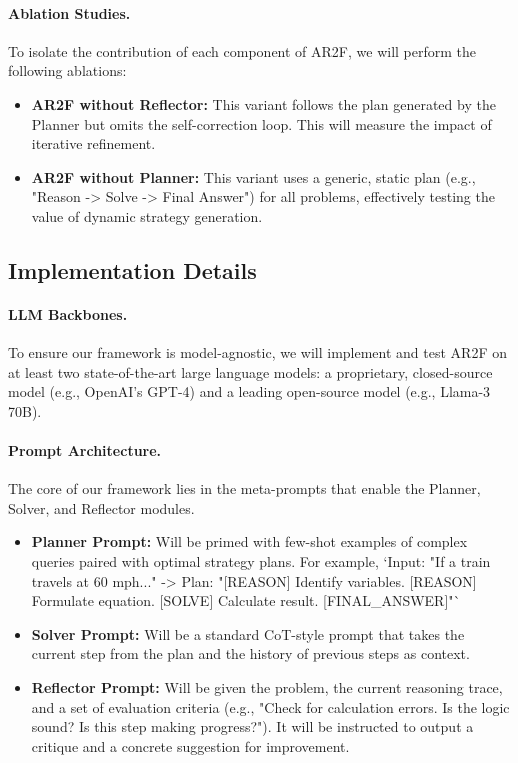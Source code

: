 \documentclass{article}
\begin{document}
\paragraph{Ablation Studies.} To isolate the contribution of each component of AR2F, we will perform the following ablations:
\begin{itemize}
    \item \textbf{AR2F without Reflector:} This variant follows the plan generated by the Planner but omits the self-correction loop. This will measure the impact of iterative refinement.
    \item \textbf{AR2F without Planner:} This variant uses a generic, static plan (e.g., "Reason -> Solve -> Final Answer") for all problems, effectively testing the value of dynamic strategy generation.
\end{itemize}

\subsection{Implementation Details}
\paragraph{LLM Backbones.} To ensure our framework is model-agnostic, we will implement and test AR2F on at least two state-of-the-art large language models: a proprietary, closed-source model (e.g., OpenAI's GPT-4) and a leading open-source model (e.g., Llama-3 70B).

\paragraph{Prompt Architecture.} The core of our framework lies in the meta-prompts that enable the Planner, Solver, and Reflector modules.
\begin{itemize}
    \item \textbf{Planner Prompt:} Will be primed with few-shot examples of complex queries paired with optimal strategy plans. For example, `Input: "If a train travels at 60 mph..." -> Plan: "[REASON] Identify variables. [REASON] Formulate equation. [SOLVE] Calculate result. [FINAL_ANSWER]"`
    \item \textbf{Solver Prompt:} Will be a standard CoT-style prompt that takes the current step from the plan and the history of previous steps as context.
    \item \textbf{Reflector Prompt:} Will be given the problem, the current reasoning trace, and a set of evaluation criteria (e.g., "Check for calculation errors. Is the logic sound? Is this step making progress?"). It will be instructed to output a critique and a concrete suggestion for improvement.
\end{itemize}
\end{document}
